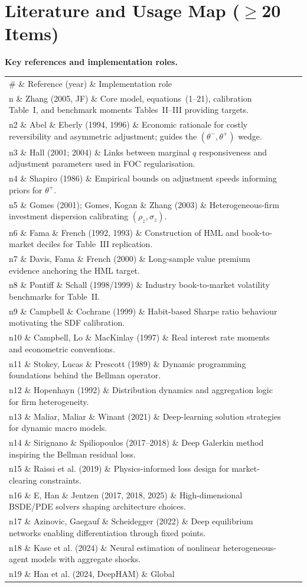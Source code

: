 \documentclass[11pt,a4paper]{article}
\numberwithin{equation}{section}
\begin{document}
\section{Literature and Usage Map (\(\geq\)20 Items)}
\small
\noindent\textbf{Key references and implementation roles.}
\begin{tabularx}{\textwidth}{>{\raggedright\arraybackslash}p{1.2em} >{\raggedright\arraybackslash}p{} X}
\toprule
\# \& Reference (year) \& Implementation role \\n\midrule
1 \& Zhang (2005, JF) \& Core model, equations~(1--21), calibration Table~I, and benchmark moments Tables~II--III providing targets. \\n2 \& Abel \& Eberly (1994, 1996) \& Economic rationale for costly reversibility and asymmetric adjustment; guides the $(\theta^- , \theta^+)$ wedge. \\n3 \& Hall (2001; 2004) \& Links between marginal $q$ responsiveness and adjustment parameters used in FOC regularisation. \\n4 \& Shapiro (1986) \& Empirical bounds on adjustment speeds informing priors for $\theta^+$. \\n5 \& Gomes (2001); Gomes, Kogan \& Zhang (2003) \& Heterogeneous-firm investment dispersion calibrating $(\rho_z, \sigma_z)$. \\n6 \& Fama \& French (1992, 1993) \& Construction of HML and book-to-market deciles for Table~III replication. \\n7 \& Davis, Fama \& French (2000) \& Long-sample value premium evidence anchoring the HML target. \\n8 \& Pontiff \& Schall (1998/1999) \& Industry book-to-market volatility benchmarks for Table~II. \\n9 \& Campbell \& Cochrane (1999) \& Habit-based Sharpe ratio behaviour motivating the SDF calibration. \\n10 \& Campbell, Lo \& MacKinlay (1997) \& Real interest rate moments and econometric conventions. \\n11 \& Stokey, Lucas \& Prescott (1989) \& Dynamic programming foundations behind the Bellman operator. \\n12 \& Hopenhayn (1992) \& Distribution dynamics and aggregation logic for firm heterogeneity. \\n13 \& Maliar, Maliar \& Winant (2021) \& Deep-learning solution strategies for dynamic macro models. \\n14 \& Sirignano \& Spiliopoulos (2017--2018) \& Deep Galerkin method inspiring the Bellman residual loss. \\n15 \& Raissi et al. (2019) \& Physics-informed loss design for market-clearing constraints. \\n16 \& E, Han \& Jentzen (2017, 2018, 2025) \& High-dimensional BSDE/PDE solvers shaping architecture choices. \\n17 \& Azinovic, Gaegauf \& Scheidegger (2022) \& Deep equilibrium networks enabling differentiation through fixed points. \\n18 \& Kase et al. (2024) \& Neural estimation of nonlinear heterogeneous-agent models with aggregate shocks. \\n19 \& Han et al. (2024, DeepHAM) \& Global 
\end{tabularx}
\end{document}
